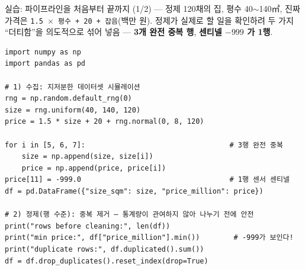 \documentclass[aspectratio=169,11pt]{beamer}
\begin{document}

\begin{frame}[fragile]{실습: 파이프라인을 처음부터 끝까지 (1/2) --- 정제}
  120채의 집, 평수 40$\sim$140㎡, 진짜 가격은
  \texttt{1.5 $\times$ 평수 + 20 + 잡음}(백만 원). 정제가 실제로 할
  일을 확인하려 두 가지 ``더티함''을 의도적으로 섞어 넣음 ---
  \textbf{3개 완전 중복 행}, \textbf{센티넬 $-999$ 가 1행}.
  \begin{lstlisting}
import numpy as np
import pandas as pd

# 1) 수집: 지저분한 데이터셋 시뮬레이션
rng = np.random.default_rng(0)
size = rng.uniform(40, 140, 120)
price = 1.5 * size + 20 + rng.normal(0, 8, 120)

for i in [5, 6, 7]:                                  # 3행 완전 중복
    size = np.append(size, size[i])
    price = np.append(price, price[i])
price[11] = -999.0                                   # 1행 센서 센티넬
df = pd.DataFrame({"size_sqm": size, "price_million": price})

# 2) 정제(행 수준): 중복 제거 — 통계량이 관여하지 않아 나누기 전에 안전
print("rows before cleaning:", len(df))
print("min price:", df["price_million"].min())        # -999가 보인다!
print("duplicate rows:", df.duplicated().sum())
df = df.drop_duplicates().reset_index(drop=True)
\end{lstlisting}
\end{frame}
\end{document}
